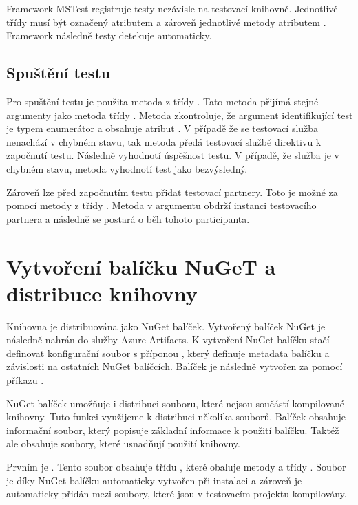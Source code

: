 Framework MSTest registruje testy nezávisle na testovací knihovně. Jednotlivé třídy musí být označený atributem  a zároveň jednotlivé metody atributem . Framework následně testy detekuje automaticky.

\subsection{Spuštění testu}
Pro spuštění testu je použita metoda  z třídy . Tato metoda přijímá stejné argumenty jako metoda  třídy . Metoda zkontroluje, že argument identifikující test je typem enumerátor a obsahuje atribut . V případě že se testovací služba nenachází v chybném stavu, tak metoda předá testovací službě direktivu k započnutí testu. Následně vyhodnotí úspěšnost testu. V případě, že služba je v chybném stavu, metoda vyhodnotí test jako bezvýsledný.

Zároveň lze před započnutím testu přidat testovací partnery. Toto je možné za pomocí metody  z třídy . Metoda v argumentu obdrží instanci testovacího partnera a následně se postará o běh tohoto participanta.


\section{Vytvoření balíčku NuGeT a distribuce knihovny}\label{sec:distrbution}

Knihovna je distribuována jako NuGet balíček. Vytvořený balíček NuGet je následně nahrán do služby Azure Artifacts. K vytvoření NuGet balíčku stačí definovat konfigurační soubor s příponou , který definuje metadata balíčku a závislosti na ostatních NuGet balíčcích. Balíček je následně vytvořen za pomocí příkazu . 

NuGet balíček umožňuje i distribuci souboru, které nejsou součástí kompilované knihovny. Tuto funkci využijeme k distribuci několika souborů. Balíček obsahuje informační soubor, který popisuje základní informace k použití balíčku. Taktéž ale obsahuje soubory, které usnadňují použití knihovny. 

Prvním je . Tento soubor obsahuje třídu , které obaluje metody  a  třídy . Soubor je díky NuGet balíčku automaticky vytvořen při instalaci a zároveň je automaticky přidán mezi soubory, které jsou v testovacím projektu kompilovány. 

